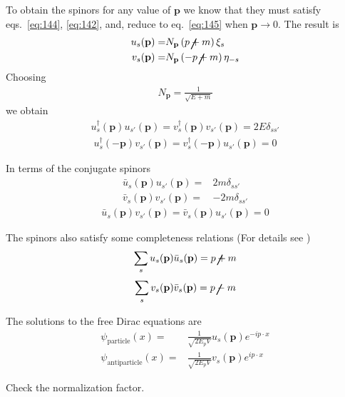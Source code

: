 \begin{frame}
To obtain the spinors for any value of $\mathbf{p}$ we know that they must satisfy eqs.~\eqref{eq:144}, \eqref{eq:142}, and, reduce to eq.~\eqref{eq:145} when $\mathbf{p}\to 0$. 
The result is
\begin{align}
  u_s(\mathbf{p})=&N_{\mathbf{p}}\left(\cancel{p}+m\right)\xi_s\nonumber\\
  v_s(\mathbf{p})=&N_{\mathbf{p}}\left(-\cancel{p}+m\right)\eta_{-s}
\end{align}
Choosing
\begin{align}
  N_{\mathbf{p}}=\frac{1}{\sqrt{E+m}}
\end{align}
we obtain
\begin{align}
  u_s^\dagger(\mathbf{p})u_{s'}(\mathbf{p})=v_s^\dagger(\mathbf{p})v_{s'}(\mathbf{p})=2E \delta_{s s'}
\end{align}
\begin{align}
  u_s^\dagger(-\mathbf{p})v_{s'}(\mathbf{p})=v_s^\dagger(-\mathbf{p})u_{s'}(\mathbf{p})=0
\end{align}

In terms of the conjugate spinors
\begin{align}
  \bar{u}_s(\mathbf{p})u_{s'}(\mathbf{p})=&2m \delta_{s s'}\nonumber\\
  \bar{v}_s(\mathbf{p})v_{s'}(\mathbf{p})=&-2m \delta_{s s'}
\end{align}
\begin{align}
  \bar{u}_s(\mathbf{p})v_{s'}(\mathbf{p})=\bar{v}_s(\mathbf{p})u_{s'}(\mathbf{p})=0
\end{align}


The spinors also satisfy some completeness relations (For details see \cite{physics/0703214})
\begin{align}
  \sum_s u_s(\mathbf{p})\bar{u}_s(\mathbf{p})=\cancel{p}+m
\end{align}
\begin{align}
  \sum_s v_s(\mathbf{p})\bar{v}_s(\mathbf{p})=\cancel{p}-m
\end{align}

The solutions to the free Dirac equations are
\begin{align}
  \psi_{\text{particle}}(x)=&\frac{1}{\sqrt{2E_p V}}u_s(\mathbf{p})e^{-i p\cdot x}\nonumber\\
  \psi_{\text{antiparticle}}(x)=&\frac{1}{\sqrt{2E_p V}}v_s(\mathbf{p})e^{i p\cdot x}
\end{align}
\begin{inprogress}
  Check the normalization factor.
\end{inprogress}


\end{frame}
